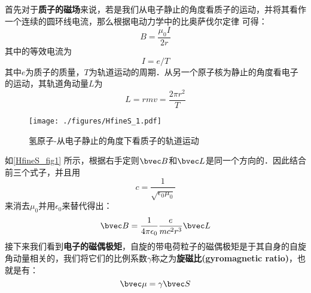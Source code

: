 首先对于\textbf{质子的磁场}来说，若是我们从电子静止的角度看质子的运动，并将其看作一个连续的圆环线电流，那么根据电动力学中的比奥萨伐尔定律 可得：
\begin{equation}
B=\frac{\mu_0I}{2r}
\end{equation}
其中的等效电流为
\begin{equation}
I=e/T
\end{equation}
其中$e$为质子的质量，$T$为轨道运动的周期．从另一个原子核为静止的角度看电子的运动，其轨道角动量$L$为
\begin{equation}
L=rmv=\frac{2\pi r^2}{T}
\end{equation}
\begin{figure}[ht]
\centering
\texttt{[image: ./figures/HfineS\_1.pdf]}
\caption{氢原子-从电子静止的角度下看质子的轨道运动} \label{HfineS_fig1}
\end{figure}
如\autoref{HfineS_fig1} 所示，根据右手定则$\bvec B$和$\bvec L$是同一个方向的．因此结合前三个式子，并且用
\begin{equation}
c=\frac{1}{\sqrt{\epsilon_0\mu_0}}
\end{equation}
来消去$\mu_0$并用$\epsilon_0$来替代得出：
\begin{equation}
\bvec B = \frac{1}{4\pi\epsilon_0}\frac{e}{mc^2r^3}\bvec L
\end{equation}
接下来我们看到\textbf{电子的磁偶极矩}，自旋的带电荷粒子的磁偶极矩是于其自身的自旋角动量相关的，我们将它们的比例系数$\gamma$称之为\textbf{旋磁比(gyromagnetic
ratio)}，也就是有：
\begin{equation}
\bvec\mu=\gamma\bvec S
\end{equation}


